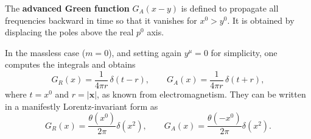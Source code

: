 The \textbf{advanced Green function} $G_A(x - y)$ is defined to propagate all frequencies backward in time so that it vanishes for $x^0 > y^0$. It is obtained by displacing the poles above the real $p^0$ axis.

In the massless case ($m = 0$), and setting again $y^\mu = 0$ for simplicity, one computes the integrals and obtains
\begin{equation}
    G_R(x) = \frac{1}{4\pi r} \, \delta(t - r),
    \qquad
    G_A(x) = \frac{1}{4\pi r} \, \delta(t + r),
    \label{eq:42}
\end{equation}
where $t = x^0$ and $r = |\mathbf{x}|$, as known from electromagnetism. They can be written in a manifestly Lorentz-invariant form as
\begin{equation}
    G_R(x) = \frac{\theta(x^0)}{2\pi} \delta(x^2),
    \qquad
    G_A(x) = \frac{\theta(-x^0)}{2\pi} \delta(x^2).
    \label{eq:43}
\end{equation}

